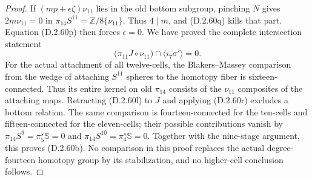 \begin{proof}
If $(mp+\epsilon\zeta)\nu_{11}$ lies in the old bottom
subgroup, pinching $N$ gives $2m\nu_{11}=0$ in
$\pi_{14}S^{11}=\mathbb Z/8\{\nu_{11}\}$.
Thus $4\mid m$, and \textup{(D.2.60q)} kills that part.
Equation \textup{(D.2.60p)} then forces $\epsilon=0$.
We have proved the complete intersection statement
\[
 \bigl(\pi_{11}J\circ\nu_{11}\bigr)
                    \cap\langle i_7\sigma'\rangle=0.
 \tag{D.2.60r}
\]
For the actual attachment of all twelve-cells, the
Blakers--Massey comparison from the wedge of attaching
$S^{11}$ spheres to the homotopy fiber is
sixteen-connected.  Thus its entire kernel on old
$\pi_{14}$ consists of the $\nu_{11}$ composites of
the attaching maps.  Retracting \textup{(D.2.60l)} to
$J$ and applying \textup{(D.2.60r)} excludes a bottom
relation.  The same comparison is fourteen-connected
for the ten-cells and fifteen-connected for the
eleven-cells; their possible contributions vanish by
$\pi_{14}S^9=\pi_5^s\mathbb S=0$ and
$\pi_{14}S^{10}=\pi_4^s\mathbb S=0$.
Together with the nine-stage argument, this proves
\textup{(D.2.60b)}.  No comparison in this proof
replaces the actual degree-fourteen homotopy group by
its stabilization, and no higher-cell conclusion follows.
\end{proof}
